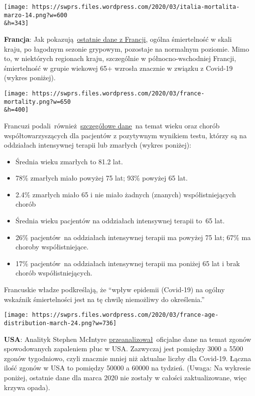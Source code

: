 \texttt{[image: https://swprs.files.wordpress.com/2020/03/italia-mortalita-marzo-14.png?w=600\\\&h=343]}

\textbf{Francja}: Jak
pokazują~\href{https://www.santepubliquefrance.fr/maladies-et-traumatismes/maladies-et-infections-respiratoires/infection-a-coronavirus/documents/bulletin-national/covid-19-point-epidemiologique-du-24-mars-2020}{ostatnie
dane z Francji}, ogólna śmiertelność w skali kraju, po łagodnym sezonie
grypowym, pozostaje na normalnym poziomie. Mimo to, w niektórych
regionach kraju, szczególnie w północno-wschodniej Francji, śmiertelność
w grupie wiekowej 65+ wzrosła znacznie w związku z Covid-19 (wykres
poniżej).

\texttt{[image: https://swprs.files.wordpress.com/2020/03/france-mortality.png?w=650\\\&h=400]}

Francuzi
podali~również~\href{https://www.santepubliquefrance.fr/maladies-et-traumatismes/maladies-et-infections-respiratoires/infection-a-coronavirus/documents/bulletin-national/covid-19-point-epidemiologique-du-24-mars-2020}{szczegółowe
dane}~na temat wieku oraz chorób współtowarzyszących dla pacjentów z
pozytywnym wynikiem testu, którzy są na oddziałach intensywnej terapii
lub zmarłych (wykres poniżej):

\begin{itemize}
\tightlist
\item
  Średnia wieku zmarłych to 81.2 lat.
\item
  78\% zmarłych miało powyżej 75 lat; 93\% powyżej 65 lat.
\item
  2.4\% zmarłych miało 65 i nie miało żadnych (znanych)
  współistniejących chorób
\item
  Średnia wieku pacjentów na oddziałach intensywnej terapii to~65 lat.
\item
  26\% pacjentów~na oddziałach intensywnej terapii ma powyżej 75 lat;
  67\% ma choroby współistniejące.
\item
  17\% pacjentów~na oddziałach intensywnej terapii ma poniżej 65 lat i
  brak chorób współistniejących.
\end{itemize}

Francuskie władze podkreślają, że ``wpływ epidemii (Covid-19) na ogólny
wskaźnik śmiertelności jest na tę chwilę niemożliwy do określenia.''

\texttt{[image: https://swprs.files.wordpress.com/2020/03/france-age-distribution-march-24.png?w=736]}

\textbf{USA}: Analityk Stephen McIntyre
\href{https://twitter.com/ClimateAudit/status/1243019315462516736}{przeanalizował}~oficjalne
dane na temat zgonów spowodowanych zapaleniem płuc w USA. Zazwyczaj jest
pomiędzy 3000 a 5500 zgonów tygodniowo, czyli znacznie mniej niż
aktualne liczby dla Covid-19. Łączna ilość zgonów w USA to pomiędzy
50000 a 60000 na tydzień. (Uwaga: Na wykresie poniżej, ostatnie dane dla
marca 2020 nie zostały w całości zaktualizowane, więc krzywa opada).

